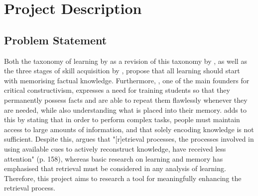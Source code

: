 \chapter{Project Description}

\section{Problem Statement}






Both the taxonomy of learning by  as a revision of this taxonomy by , as well as the three stages of skill acquisition by , propose that all learning should start with memorising factual knowledge. Furthermore, , one of the main founders for critical constructivism, expresses a need for training students so that they permanently possess facts and are able to repeat them flawlessly whenever they are needed, while also understanding what is placed into their memory.  adds to this by stating that in order to perform complex tasks, people must maintain access to large amounts of information, and that solely encoding knowledge is not sufficient. Despite this,  argues that "[r]etrieval processes, the processes involved in using available cues to actively reconstruct knowledge, have received less attention" (p. 158), whereas basic research on learning and memory has emphasised that retrieval must be considered in any analysis of learning. Therefore, this project aims to research a tool for meaningfully enhancing the retrieval process. 

